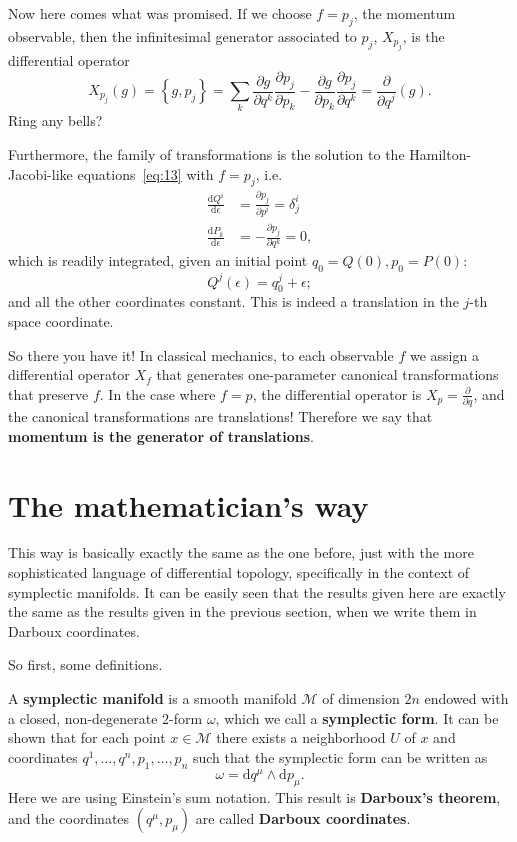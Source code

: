 \documentclass[11pt,a4]{article}
\newcommand{\de}{\mathrm{d}}
\newcommand{\tdev}[2]{\frac{\de #1}{\de #2}}
\newcommand{\pdev}[2]{\frac{\partial #1}{\partial #2}}
\newcommand{\set}[1]{\left\{#1\right\}}
\begin{document}
Now here comes what was promised. If we choose $f=p_j$, the momentum observable, then the infinitesimal
generator associated to $p_j$, $X_{p_j}$, is the differential operator
\begin{equation}
  X_{p_j}(g) = \set{g,p_j} = \sum_{k}\pdev{g}{q^k}\pdev{p_j}{p_k} - \pdev{g}{p_k}\pdev{p_j}{q^k} = \pdev{}{q^j}(g).
\end{equation}
Ring any bells?

Furthermore, the family of transformations is the solution to the Hamilton-Jacobi-like equations~\eqref{eq:13} with $f=p_j$, i.e.
\begin{equation}
  \label{eq:14}
  \begin{aligned}
    \tdev{Q^i}{\epsilon} &= \pdev{p_j}{p^i} = \delta^i_j\\
    \tdev{P_k}{\epsilon} &= -\pdev{p_j}{q^k} = 0,
  \end{aligned}
\end{equation}
which is readily integrated, given an initial point $q_0 = Q(0),p_0=P(0)$:
\begin{equation}
  Q^j(\epsilon) = q_{0}^j + \epsilon;
\end{equation}
and all the other coordinates constant. This is indeed a translation in the $j$-th space coordinate.

So there you have it! In classical mechanics, to each observable $f$ we assign a differential operator $X_f$ that
generates one-parameter canonical transformations that preserve $f$. In the case where $f=p$, the differential operator is $X_p = \pdev{}{q}$,
and the canonical transformations are translations! Therefore we say that \textbf{momentum is the generator of translations}.

\section*{The mathematician's way}
\label{sec:mathematicians-way}

This way is basically exactly the same as the one before, just with the more sophisticated language
of differential topology, specifically in the context of symplectic manifolds. It can be easily seen
that the results given here are exactly the same as the results given in the previous section, when
we write them in Darboux coordinates.

So first, some definitions.

A \textbf{symplectic manifold} is a smooth manifold $\mathcal{M}$ of dimension $2n$ endowed with a closed, non-degenerate $2$-form $\omega$, which we call a \textbf{symplectic form}. It can be shown that for each point
$x\in \mathcal{M}$ there exists a neighborhood $U$ of $x$ and coordinates $q^1,\dots,q^n,p_1,\dots,p_n$ such
that the symplectic form can be written as
\begin{equation}
  \label{eq:11}
  \omega = \de q^{\mu}\wedge\de p_{\mu}.
\end{equation}
Here we are using Einstein's sum notation. This result is \textbf{Darboux's theorem}, and the coordinates $(q^\mu,p_\mu)$ are called \textbf{Darboux coordinates}.
\end{document}
